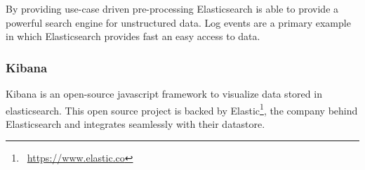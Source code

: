 By providing use-case driven pre-processing Elasticsearch is able to provide a powerful search engine for unstructured data. Log events are a primary example in which
Elasticsearch provides fast an easy access to data.

\subsubsection{Kibana}
\label{kibana}
Kibana is an open-source javascript framework to visualize data stored in \gls{elasticsearch}.
This open source project is backed by Elastic\footnote{\Mundus~\url{https://www.elastic.co}}, the company behind Elasticsearch and integrates
seamlessly with their datastore.
